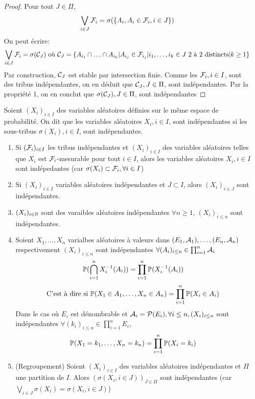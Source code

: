 \documentclass[]{report}
\begin{document}
    \begin{proof}
        Pour tout $J\in \Pi$,
        \[\bigvee_{i\in J}\mathcal{F}_i=\sigma(\{A_i,A_i\in\mathcal{F}_i,i\in J\})\]
        On peut écrire:\[\bigvee_{i\in J}\mathcal{F}_i=\sigma(\mathcal{C}_J)\text{ où }\mathcal{C}_J=\{A_{i_1}\cap\ldots\cap A_{i_k}|A_{i_j}\in\mathcal{F}_{i_j}|i_1,\ldots,i_k\in J\text{ 2 à 2 distincts}|k\ge 1\}\]
        Par construction, $\mathcal{C}_J$ est stable par intersection finie. Comme les $\mathcal{F}_i,i\in I$, sont des tribus indépendantes, on en déduit que $\mathcal{C}_J,J\in \Pi$, sont indépendantes. Par la propriété 1, on en conclut que $\sigma(\mathcal{C}_J),J\in \Pi$, sont indépendantes
    \end{proof}

    \begin{df}{}{}
        Soient $(X_i)_{i\in I}$ des variables aléatoires définies sur le même espace de probabilité. On dit que les variables aléatoires $X_i,i\in I$, sont indépendantes si les sous-tribus $\sigma(X_i),i\in I$, sont indépendantes.
    \end{df}

    \begin{re}{}{}
        \begin{enumerate}
            \item Si $(\mathcal{F}_i)_{i\in I}$ les tribus indépendantes et $(X_i)_{i\in I}$ des variables aléatoires telles que $X_i$ est $\mathcal{F}_i$-mesurable pour tout $i\in I$, alors les variables aléatoires $X_i,i\in I$ sont indépedantes (car $\sigma(X_i)\subset \mathcal{F}_i,\forall i\in I$)
            \item Si $(X_i)_{i\in I}$ variables aléatoires indépendantes et $J\subset I$, alors $(X_i)_{i\in J}$ sont indépendantes.
            \item $(X_i)_{i\in \mathbb{N}}$ sont des varaibles aléatoires indépendantes \ssi $\forall n\ge 1$, $(X_i)_{i\le n}$ sont indépendantes.
            \item Soient $X_1,\ldots,X_n$ varialbes aléatoires à valeurs dans $(E_1,\mathcal{A}_1),\ldots,(E_n,\mathcal{A}_n)$ respectivement $(X_i)_{i\le n}$ sont indépendantes \ssi $\forall (A_i)_{i\le n}\in \prod_{i=1}^{n}\mathcal{A}_i$
            \[ \mathbb{P}(\bigcap_{i=1}^n X_i^{-1}(A_i))=\prod_{i=1}^{n}\mathbb{P}(X_i^{-1}(A_i))\]
            \[\text{C'est à dire si }\mathbb{P}(X_1\in A_1,\ldots,X_n\in A_n)=\prod_{i=1}^{n}\mathbb{P}(X_i\in A_i)\]
            Dans le cas où $E_i$ est dénombrable et $\mathcal{A}_i=\mathcal{P}(E_i),\forall i\le n, (X_i)_{i\le n}$ sont indépendantes \ssi $\forall (k_i)_{i\le n}\in \prod_{i=1}^{n}E_i$,
            \[\mathbb{P}(X_1= k_1,\ldots,X_n= k_n)=\prod_{i=1}^{n}\mathbb{P}(X_i=k_i)\]
            \item (Regroupement) Soient $(X_i)_{i\in I}$ des variables aléatoires indépendantes et $\Pi$ une partition de $I$. Alors $(\sigma(X_i,i\in J))_{J\in \Pi}$ sont indépendantes (car $\bigvee_{i\in J}\sigma(X_i)=\sigma(X_i,i\in J)$)
        \end{enumerate}
    \end{re}
\end{document}
